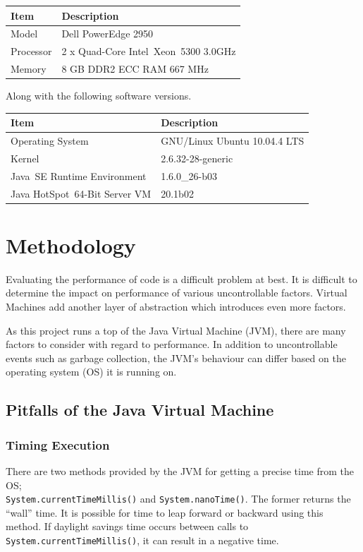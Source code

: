 \documentclass[12pt,letterpaper,oneside,notitlepage]{report}
\theoremstyle{definition}
\begin{document}
			\begin{table}[!ht]
				\centering
				\begin{tabular}{ll}
					\toprule
					Item & Description \\
					\midrule
					Model & Dell PowerEdge 2950 \\
					Processor & 2 x Quad-Core Intel\textregistered\ Xeon\texttrademark\ 5300 3.0GHz \\
					Memory & 8 GB DDR2 ECC RAM 667 MHz \\
					\bottomrule
				\end{tabular}
			\end{table}
			
			Along with the following software versions.
			
			\begin{table}[!ht]
				\centering
				\begin{tabular}{ll}
					\toprule
					Item & Description \\
					\midrule
					Operating System & GNU/Linux Ubuntu 10.04.4 LTS \\
					Kernel & 2.6.32-28-generic \\
					Java\texttrademark\ SE Runtime Environment & 1.6.0\_26-b03 \\
					Java HotSpot\texttrademark\ 64-Bit Server VM & 20.1\-b02 \\
					\bottomrule
				\end{tabular}
			\end{table}
		
		\section{Methodology}
			Evaluating the performance of code is a difficult problem at best.  It is difficult to determine the impact on performance of various uncontrollable factors.  Virtual Machines add another layer of abstraction which introduces even more factors.
			
			As this project runs a top of the Java Virtual Machine (JVM), there are many factors to consider with regard to performance.  In addition to uncontrollable events such as garbage collection, the JVM's behaviour can differ based on the operating system (OS) it is running on.
			
			\subsection{Pitfalls of the Java Virtual Machine}
				\subsubsection{Timing Execution}
					There are two methods provided by the JVM for getting a precise time from the OS; \\\texttt{System.currentTimeMillis()} and \texttt{System.nanoTime()}.  The former returns the ``wall'' time.  It is possible for time to leap forward or backward using this method.  If daylight savings time occurs between calls to \texttt{System.currentTimeMillis()}, it can result in a negative time.
					
\end{document}
